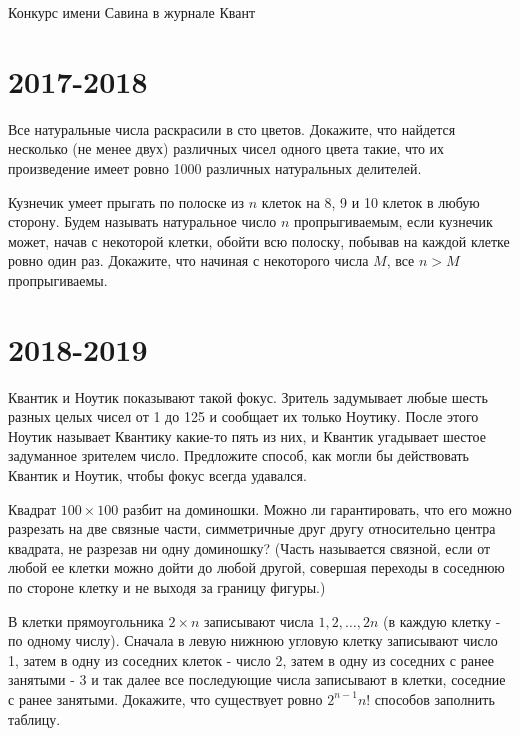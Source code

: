\documentclass[11pt, a4paper]{../problems_template}
\begin{document}
\begin{titlepage}
  \begin{center}
	\Huge{Конкурс имени Савина в журнале Квант}
  \end{center}
\end{titlepage} 

\chapter{2017-2018}

\begin{exercise}[7]
Все натуральные числа раскрасили в сто цветов. Докажите, что найдется несколько (не менее двух) различных чисел одного цвета такие, что их произведение имеет ровно 1000 различных натуральных делителей.
\end{exercise}

\begin{exercise}
Кузнечик умеет прыгать по полоске из $n$ клеток на 8, 9 и 10 клеток в любую сторону. Будем называть натуральное число $n$ пропрыгиваемым, если кузнечик может, начав с некоторой клетки, обойти всю полоску, побывав на каждой клетке ровно один раз. Докажите, что начиная с некоторого числа $M$, все $n > M$ пропрыгиваемы.
\end{exercise}

\chapter{2018-2019}

\begin{exercise}[3]
Квантик и Ноутик показывают такой фокус. Зритель задумывает любые шесть разных целых чисел от 1 до 125 и сообщает их только Ноутику. После этого Ноутик называет Квантику какие-то пять из них, и Квантик угадывает шестое задуманное зрителем число. Предложите способ, как могли бы действовать Квантик и Ноутик, чтобы фокус всегда удавался.
\end{exercise}

\begin{exercise}[4]
Квадрат $100 \times 100$ разбит на доминошки. Можно ли гарантировать, что его можно разрезать на две связные части, симметричные друг другу относительно центра квадрата, не разрезав ни одну доминошку? (Часть называется связной, если от любой ее клетки можно дойти до любой другой, совершая переходы в соседнюю по стороне клетку и не выходя за границу фигуры.)
\end{exercise}

\begin{exercise}
В клетки прямоугольника $2 \times n$ записывают числа $1, 2, \dots, 2n$ (в каждую клетку - по одному числу). Сначала в левую нижнюю угловую клетку записывают число 1, затем в одну из соседних
клеток - число 2, затем в одну из соседних с ранее занятыми - 3 и так далее все последующие числа записывают в клетки, соседние с ранее занятыми. Докажите, что существует ровно $2^{n - 1} n!$ способов
заполнить таблицу.
\end{exercise}
\end{document}
